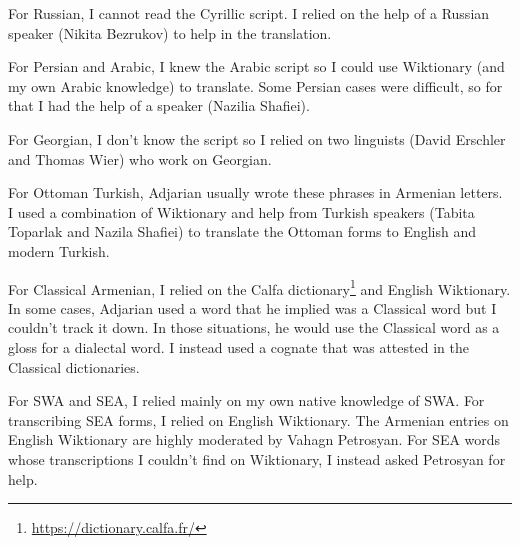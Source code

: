For Russian, I cannot read the Cyrillic script. I relied on the help of  a Russian speaker (Nikita Bezrukov) to help in the translation. 

For Persian and Arabic, I knew the Arabic script so I could use Wiktionary (and my own Arabic knowledge) to translate. Some Persian cases were difficult, so for that I had the help of a speaker (Nazilia Shafiei). 

For Georgian, I don't know the script so I relied on two linguists (David Erschler and Thomas Wier) who work on Georgian. 

For Ottoman Turkish, Adjarian usually wrote these phrases in Armenian letters. I used a combination of Wiktionary and help from Turkish speakers (Tabita Toparlak and Nazila Shafiei) to translate the Ottoman forms to English and modern Turkish. 

For Classical Armenian, I relied on the Calfa dictionary\footnote{\url{https://dictionary.calfa.fr/}} and English Wiktionary. In some cases, Adjarian used a word that he implied was a Classical word but I couldn't track it down. In those situations, he would use the Classical word as a gloss for a  dialectal word. I instead used a cognate that was attested in the Classical dictionaries. 

For SWA and SEA, I relied mainly on my own native knowledge of SWA. For transcribing SEA forms, I relied on English Wiktionary. The Armenian entries on English Wiktionary are highly moderated by Vahagn Petrosyan. For SEA words whose transcriptions I couldn't find on Wiktionary, I instead asked Petrosyan for help. 


